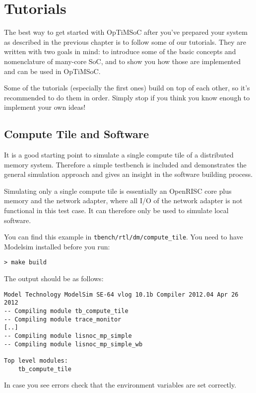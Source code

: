 \chapter{Tutorials}
\label{chap:tutorials}

The best way to get started with OpTiMSoC after you've prepared your system as
described in the previous chapter is to follow some of our tutorials. They are
written with two goals in mind: to introduce some of the basic concepts and
nomenclature of many-core SoC, and to show you how those are implemented and
can be used in OpTiMSoC.

Some of the tutorials (especially the first ones) build on top of each other,
so it's recommended to do them in order. Simply stop if you think you know
enough to implement your own ideas!

\section{Compute Tile and Software}

It is a good starting point to simulate a single compute tile of a
distributed memory system. Therefore a simple testbench is included
and demonstrates the general simulation approach and gives an insight
in the software building process.

Simulating only a single compute tile is essentially an OpenRISC core
plus memory and the network adapter, where all I/O of the network
adapter is not functional in this test case. It can therefore only be
used to simulate local software.

You can find this example in \verb|tbench/rtl/dm/compute_tile|. You
need to have Modelsim installed before you run:

\begin{verbatim}
> make build
\end{verbatim}

The output should be as follows:

\begin{verbatim}
Model Technology ModelSim SE-64 vlog 10.1b Compiler 2012.04 Apr 26 2012
-- Compiling module tb_compute_tile
-- Compiling module trace_monitor
[..]
-- Compiling module lisnoc_mp_simple
-- Compiling module lisnoc_mp_simple_wb

Top level modules:
	tb_compute_tile
\end{verbatim}

In case you see errors check that the environment variables are set
correctly.

